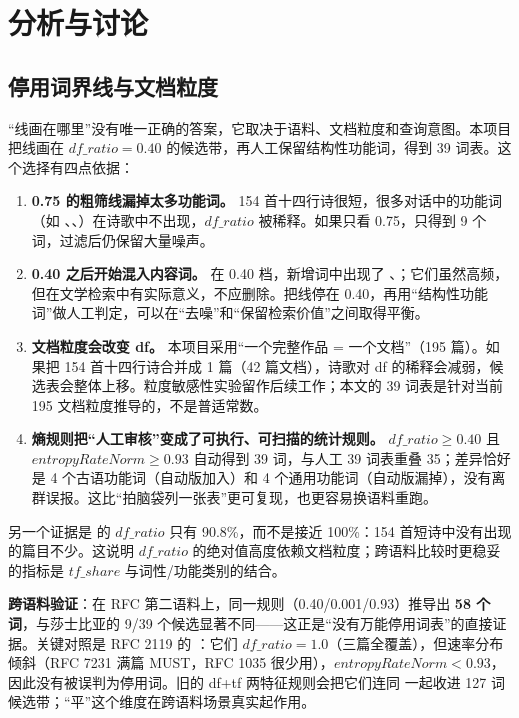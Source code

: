 \chapter{分析与讨论}\label{ch:analysis}

\section{停用词界线与文档粒度}

“线画在哪里”没有唯一正确的答案，它取决于语料、文档粒度和查询意图。本项目把线画在 $df\_ratio = 0.40$ 的候选带，再人工保留结构性功能词，得到 39 词表。这个选择有四点依据：

\begin{enumerate}
  \item \textbf{0.75 的粗筛线漏掉太多功能词。} 154 首十四行诗很短，很多对话中的功能词（如 、、）在诗歌中不出现，$df\_ratio$ 被稀释。如果只看 0.75，只得到 9 个词，过滤后仍保留大量噪声。
  \item \textbf{0.40 之后开始混入内容词。} 在 0.40 档，新增词中出现了 、；它们虽然高频，但在文学检索中有实际意义，不应删除。把线停在 0.40，再用“结构性功能词”做人工判定，可以在“去噪”和“保留检索价值”之间取得平衡。
  \item \textbf{文档粒度会改变 df。} 本项目采用“一个完整作品 = 一个文档”（195 篇）。如果把 154 首十四行诗合并成 1 篇（42 篇文档），诗歌对 df 的稀释会减弱，候选表会整体上移。粒度敏感性实验留作后续工作；本文的 39 词表是针对当前 195 文档粒度推导的，不是普适常数。
  \item \textbf{熵规则把“人工审核”变成了可执行、可扫描的统计规则。} $df\_ratio \ge 0.40$ 且 $entropyRateNorm \ge 0.93$ 自动得到 39 词，与人工 39 词表重叠 35；差异恰好是 4 个古语功能词（自动版加入）和 4 个通用功能词（自动版漏掉），没有离群误报。这比“拍脑袋列一张表”更可复现，也更容易换语料重跑。
\end{enumerate}

另一个证据是  的 $df\_ratio$ 只有 90.8\%，而不是接近 100\%：154 首短诗中没有出现  的篇目不少。这说明 $df\_ratio$ 的绝对值高度依赖文档粒度；跨语料比较时更稳妥的指标是 $tf\_share$ 与词性/功能类别的结合。

\textbf{跨语料验证}：在 RFC 第二语料上，同一规则（0.40/0.001/0.93）推导出 \textbf{58 个词}，与莎士比亚的 9/39 个候选显著不同——这正是“没有万能停用词表”的直接证据。关键对照是 RFC 2119 的 ：它们 $df\_ratio = 1.0$（三篇全覆盖），但速率分布倾斜（RFC 7231 满篇 MUST，RFC 1035 很少用），$entropyRateNorm < 0.93$，因此没有被误判为停用词。旧的 df+tf 两特征规则会把它们连同  一起收进 127 词候选带；“平”这个维度在跨语料场景真实起作用。

